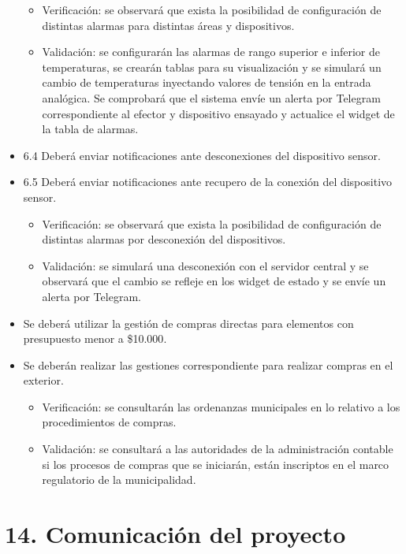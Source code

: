 \documentclass[11pt]{proyecto}
\begin{document}
\begin{itemize}
\begin{itemize}
\item Verificación: se observará que exista la posibilidad de configuración de distintas alarmas para distintas áreas y dispositivos.
\item Validación: se configurarán las alarmas de rango superior e inferior de temperaturas, se crearán tablas para su visualización y se simulará un cambio de temperaturas inyectando valores de tensión en la entrada analógica. Se comprobará que el sistema envíe un alerta por Telegram correspondiente al efector y dispositivo ensayado y actualice el widget de la tabla de alarmas. 
\end{itemize}

\item 6.4 Deberá enviar notificaciones ante desconexiones del dispositivo sensor.
\item 6.5 Deberá enviar notificaciones ante recupero de la conexión del dispositivo sensor. 
\begin{itemize}
\item Verificación: se observará que exista la posibilidad de configuración de distintas alarmas por desconexión del dispositivos.
\item Validación: se simulará una desconexión con el servidor central y se observará que el cambio se refleje en los widget de estado y se envíe un alerta por Telegram.
\end{itemize}
 
\item Se deberá utilizar la gestión de compras directas para elementos con presupuesto menor a {\$10.000}.
\item Se deberán realizar las gestiones correspondiente para realizar compras en el exterior.

\begin{itemize}
\item Verificación: se consultarán las ordenanzas municipales en lo relativo a los procedimientos de compras.
\item Validación: se consultará a las autoridades de la administración contable si los procesos de compras que se iniciarán, están inscriptos en el marco regulatorio de la municipalidad.
\end{itemize}


\end{itemize}

\section{14. Comunicación del proyecto}
\label{sec:comunicaciones}
\end{document}
